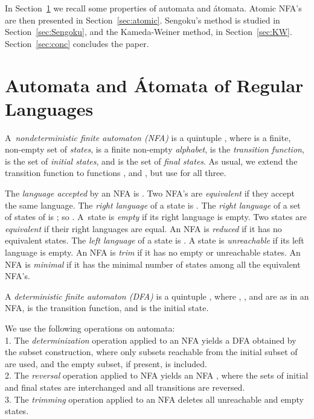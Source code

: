 \documentclass{llncs}
\begin{document}
In Section~\ref{sec:aut} we recall some properties of automata and \'atomata.
Atomic NFA's are then presented in Section~\ref{sec:atomic}.
Sengoku's method is studied in Section~\ref{sec:Sengoku}, and
the Kameda-Weiner method, in Section~\ref{sec:KW}.
Section~\ref{sec:conc} concludes the paper.


\section{Automata and \'Atomata of Regular Languages}
\label{sec:aut}

A~\emph{nondeterministic finite automaton (NFA)} is a quintuple 
, where 
 is a finite, non-empty set of \emph{states}, 
 is a finite non-empty \emph{alphabet}, 
 is the  \emph{transition function},
 is the set of  \emph{initial states},
and  is the set of \emph{final states}.
As usual, we extend the transition function to functions 
, and 
, but
use 
 for all three.

The \emph{language accepted} by an NFA  is 
.
Two NFA's are \emph{equivalent} if they accept the same language. 
The \emph{right language} of a state   is
.
The \emph{right language} of a set  of states of  is
; so
.
A~state is \emph{empty} if its right language is empty.
Two states   are \emph{equivalent} if their right 
languages are equal. 
An NFA is \emph{reduced} if it has no equivalent states.
The \emph{left language} of a state   is
.
A state is \emph{unreachable} if its left language is empty.
An NFA is \emph{trim} if it has no empty or unreachable states.
An NFA is \emph{minimal} if it has the minimal number of states among all
the equivalent NFA's.

A \emph{deterministic finite automaton (DFA)} is a quintuple 
, where
, , and  are as in an NFA, 
 is the transition function, 
and  is the initial state. 

We use the following operations on automata: \\
 1.
The \emph{determinization} operation  
applied to an NFA  yields a DFA  obtained by 
the subset construction, where only subsets reachable 
from the initial subset of  are used, and the empty subset, 
if present, is included. \\
 2.
The \emph{reversal} operation  applied to NFA  yields 
an NFA , where the sets of initial and final states are 
interchanged and all transitions are reversed. \\
 3.
The \emph{trimming} operation  applied to an NFA deletes all unreachable and empty states.
\smallskip
\end{document}
